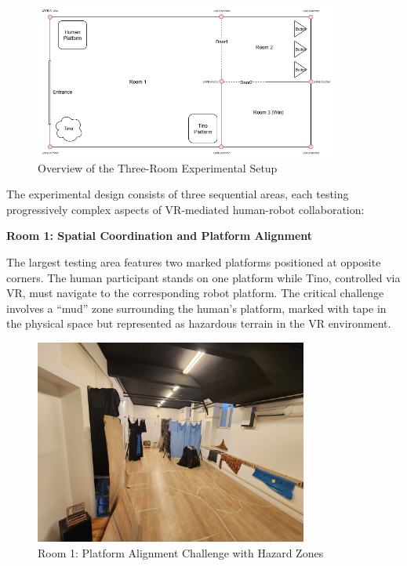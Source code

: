 \begin{figure}[H]
    \centering
    \includegraphics[width=0.9\textwidth]{Images/LabOverview.png}
    \caption{Overview of the Three-Room Experimental Setup}
    \label{fig:lab_experiment_overview}
\end{figure}

The experimental design consists of three sequential areas, each testing progressively complex aspects of VR-mediated human-robot collaboration:

\textbf{Room 1: Spatial Coordination and Platform Alignment}

The largest testing area features two marked platforms positioned at opposite corners. The human participant stands on one platform while Tino, controlled via VR, must navigate to the corresponding robot platform. The critical challenge involves a ``mud'' zone surrounding the human's platform, marked with tape in the physical space but represented as hazardous terrain in the VR environment.

\begin{figure}[H]
    \centering
    \includegraphics[width=0.8\textwidth]{Images/LabVisualAids (4).jpg}
    \caption{Room 1: Platform Alignment Challenge with Hazard Zones}
    \label{fig:room1_platform_challenge}
\end{figure}

